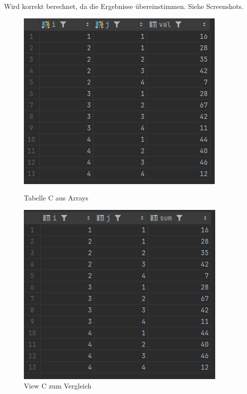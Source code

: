 \documentclass[11pt]{scrartcl}
\begin{document}
Wird korrekt berechnet, da die Ergebnisse übereinstimmen. Siehe Screenshots.
\begin{figure}[H]
  \begin{minipage}[b]{.4\linewidth}
    \begin{center}
      \includegraphics[width=\linewidth]{Tabelle_new_c.png}
      \caption{Tabelle C aus Arrays}
    \end{center}
  \end{minipage}
  \hspace{.1\linewidth}
  \begin{minipage}[b]{.4\linewidth}
    \begin{center}
      \includegraphics[width=\linewidth]{View_C_im_Vergleich.png}
      \caption{View C zum Vergleich}
    \end{center}
  \end{minipage}
	\label{fig:}
\end{figure}
\end{document}
